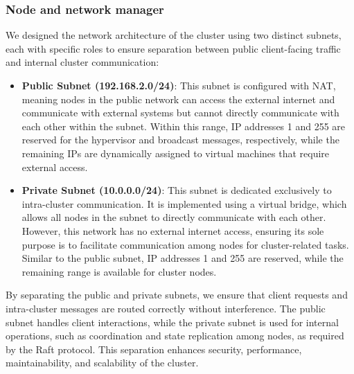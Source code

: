 \subsubsection{Node and network manager}
We designed the network architecture of the cluster using two distinct subnets, each with specific 
roles to ensure separation between public client-facing traffic and internal cluster communication:
\begin{itemize}
	\item \textbf{Public Subnet (192.168.2.0/24)}:
    This subnet is configured with NAT, meaning nodes in the public network can access the external 
    internet and communicate with external systems but cannot directly communicate with each other within the subnet.
    Within this range, IP addresses 1 and 255 are reserved for the hypervisor and broadcast 
    messages, respectively, while the remaining IPs are dynamically assigned to virtual machines that require external access.

  \item \textbf{Private Subnet (10.0.0.0/24)}:
    This subnet is dedicated exclusively to intra-cluster communication. It is implemented using 
    a virtual bridge, which allows all nodes in the subnet to directly communicate with each other. 
    However, this network has no external internet access, ensuring its sole purpose is to facilitate 
    communication among nodes for cluster-related tasks.
    Similar to the public subnet, IP addresses 1 and 255 are reserved, while the remaining range 
    is available for cluster nodes.
\end{itemize}
By separating the public and private subnets, we ensure that client requests and intra-cluster messages
are routed correctly without interference. The public subnet handles client interactions, while the 
private subnet is used for internal operations, such as coordination and state replication among nodes,
as required by the Raft protocol.
This separation enhances security, performance, maintainability, and scalability of the cluster.

